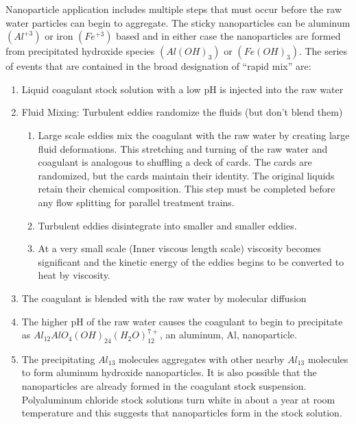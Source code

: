 \documentclass[letterpaper,10pt,english]{sphinxmanual}
\begin{document}
Nanoparticle application includes multiple steps that must occur before the raw water particles can begin to aggregate. The sticky nanoparticles can be aluminum \((Al^{+3})\) or iron \((Fe^{+3})\) based and in either case the nanoparticles are formed from precipitated hydroxide species \((Al(OH)_3)\) or \((Fe(OH)_3)\). The series of events that are contained in the broad designation of “rapid mix” are:
\begin{enumerate}
\item {} 
Liquid coagulant stock solution with a low pH is injected into the raw water

\item {} 
Fluid Mixing: Turbulent eddies randomize the fluids (but don’t blend them)
\begin{enumerate}
\item {} 
Large scale eddies mix the coagulant with the raw water by creating large fluid deformations. This stretching and turning of the raw water and coagulant is analogous to shuffling a deck of cards. The cards are randomized, but the cards maintain their identity. The original liquids retain their chemical composition. This step must be completed before any flow splitting for parallel treatment trains.

\item {} 
Turbulent eddies disintegrate into smaller and smaller eddies.

\item {} 
At a very small scale (Inner viscous length scale) viscosity becomes significant and the kinetic energy of the eddies begins to be converted to heat by viscosity.

\end{enumerate}

\item {} 
The coagulant is blended with the raw water by molecular diffusion

\item {} 
The higher pH of the raw water causes the coagulant to begin to precipitate as \(Al_{12}AlO_4(OH)_{24}(H_2O)_{12}^{7+}\), an aluminum, Al, nanoparticle.

\item {} 
The precipitating \(Al_{13}\) molecules aggregates with other nearby \(Al_{13}\) molecules to form aluminum hydroxide nanoparticles. It is also possible that the nanoparticles are already formed in the coagulant stock suspension. Polyaluminum chloride stock solutions turn white in about a year at room temperature and this suggests that nanoparticles form in the stock solution.


\end{enumerate}
\end{document}

